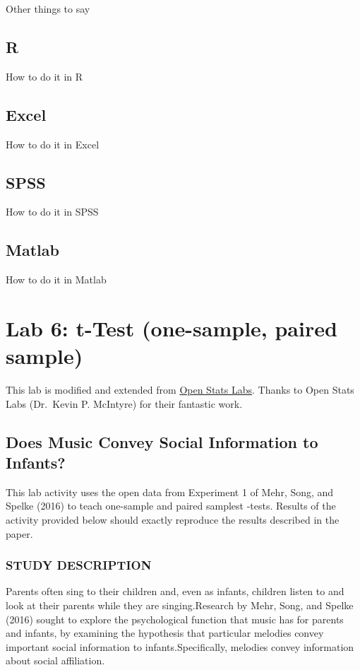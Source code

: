 \documentclass[]{book}
\theoremstyle{definition}
\theoremstyle{definition}
\theoremstyle{definition}
\theoremstyle{remark}
\begin{document}
Other things to say

\section{R}\label{r-5}

How to do it in R

\section{Excel}\label{excel-4}

How to do it in Excel

\section{SPSS}\label{spss-4}

How to do it in SPSS

\section{Matlab}\label{matlab-4}

How to do it in Matlab

\chapter{Lab 6: t-Test (one-sample, paired
sample)}\label{lab-6-t-test-one-sample-paired-sample}

This lab is modified and extended from
\href{https://sites.trinity.edu/osl}{Open Stats Labs}. Thanks to Open
Stats Labs (Dr.~Kevin P. McIntyre) for their fantastic work.

\section{Does Music Convey Social Information to
Infants?}\label{does-music-convey-social-information-to-infants}

This lab activity uses the open data from Experiment 1 of Mehr, Song,
and Spelke (2016) to teach one-sample and paired samplest -tests.
Results of the activity provided below should exactly reproduce the
results described in the paper.

\subsection{STUDY DESCRIPTION}\label{study-description}

Parents often sing to their children and, even as infants, children
listen to and look at their parents while they are singing.Research by
Mehr, Song, and Spelke (2016) sought to explore the psychological
function that music has for parents and infants, by examining the
hypothesis that particular melodies convey important social information
to infants.Specifically, melodies convey information about social
affiliation.
\end{document}
